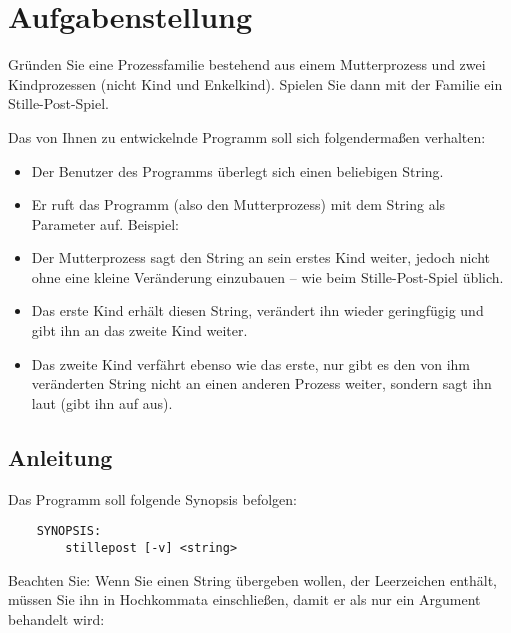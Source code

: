




\section*{Aufgabenstellung}

Gründen Sie eine Prozessfamilie bestehend aus einem Mutterprozess und
zwei Kindprozessen (nicht Kind und Enkelkind). Spielen Sie dann mit
der Familie ein Stille-Post-Spiel.

Das von Ihnen zu entwickelnde Programm  soll sich
folgendermaßen verhalten:

\begin{itemize}
\item Der Benutzer des Programms überlegt sich einen beliebigen
String.
\item Er ruft das Programm (also den Mutterprozess) mit dem String als
Parameter auf. Beispiel: 
\item Der Mutterprozess sagt den String an sein erstes Kind weiter,
jedoch nicht ohne eine kleine Veränderung einzubauen -- wie beim
Stille-Post-Spiel üblich.
\item Das erste Kind erhält diesen String, verändert ihn wieder
geringfügig und gibt ihn an das zweite Kind weiter.
\item Das zweite Kind verfährt ebenso wie das erste, nur gibt es den
von ihm veränderten String nicht an einen anderen Prozess weiter,
sondern sagt ihn laut (gibt ihn auf  aus).
\end{itemize}

\subsection*{Anleitung}

Das Programm soll folgende Synopsis befolgen:
\begin{verbatim}
    SYNOPSIS:
        stillepost [-v] <string>
\end{verbatim}

Beachten Sie: Wenn Sie einen String übergeben wollen, der Leerzeichen
enthält, müssen Sie ihn in Hochkommata einschließen, damit er als
nur ein Argument behandelt wird: 

